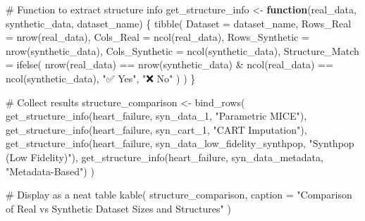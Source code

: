 \documentclass[
  letterpaper,
  DIV=11,
  numbers=noendperiod]{scrartcl}
\newenvironment{Shaded}{\begin{snugshade}}{\end{snugshade}}
\newcommand{\AttributeTok}[1]{\textcolor[rgb]{0.40,0.45,0.13}{#1}}
\newcommand{\CommentTok}[1]{\textcolor[rgb]{0.37,0.37,0.37}{#1}}
\newcommand{\ControlFlowTok}[1]{\textcolor[rgb]{0.00,0.23,0.31}{\textbf{#1}}}
\newcommand{\FunctionTok}[1]{\textcolor[rgb]{0.28,0.35,0.67}{#1}}
\newcommand{\NormalTok}[1]{\textcolor[rgb]{0.00,0.23,0.31}{#1}}
\newcommand{\OtherTok}[1]{\textcolor[rgb]{0.00,0.23,0.31}{#1}}
\newcommand{\SpecialCharTok}[1]{\textcolor[rgb]{0.37,0.37,0.37}{#1}}
\newcommand{\StringTok}[1]{\textcolor[rgb]{0.13,0.47,0.30}{#1}}
\begin{document}
\begin{Shaded}
\begin{Highlighting}[]
\CommentTok{\# Function to extract structure info}
\NormalTok{get\_structure\_info }\OtherTok{\textless{}{-}} \ControlFlowTok{function}\NormalTok{(real\_data, synthetic\_data, dataset\_name) \{}
  \FunctionTok{tibble}\NormalTok{(}
    \AttributeTok{Dataset =}\NormalTok{ dataset\_name,}
    \AttributeTok{Rows\_Real =} \FunctionTok{nrow}\NormalTok{(real\_data),}
    \AttributeTok{Cols\_Real =} \FunctionTok{ncol}\NormalTok{(real\_data),}
    \AttributeTok{Rows\_Synthetic =} \FunctionTok{nrow}\NormalTok{(synthetic\_data),}
    \AttributeTok{Cols\_Synthetic =} \FunctionTok{ncol}\NormalTok{(synthetic\_data),}
    \AttributeTok{Structure\_Match =} \FunctionTok{ifelse}\NormalTok{(}
      \FunctionTok{nrow}\NormalTok{(real\_data) }\SpecialCharTok{==} \FunctionTok{nrow}\NormalTok{(synthetic\_data) }\SpecialCharTok{\&} \FunctionTok{ncol}\NormalTok{(real\_data) }\SpecialCharTok{==} \FunctionTok{ncol}\NormalTok{(synthetic\_data),}
      \StringTok{"✅ Yes"}\NormalTok{, }\StringTok{"❌ No"}
\NormalTok{    )}
\NormalTok{  )}
\NormalTok{\}}

\CommentTok{\# Collect results}
\NormalTok{structure\_comparison }\OtherTok{\textless{}{-}} \FunctionTok{bind\_rows}\NormalTok{(}
  \FunctionTok{get\_structure\_info}\NormalTok{(heart\_failure, syn\_data\_1, }\StringTok{"Parametric MICE"}\NormalTok{),}
  \FunctionTok{get\_structure\_info}\NormalTok{(heart\_failure, syn\_cart\_1, }\StringTok{"CART Imputation"}\NormalTok{),}
  \FunctionTok{get\_structure\_info}\NormalTok{(heart\_failure, syn\_data\_low\_fidelity\_synthpop, }\StringTok{"Synthpop (Low Fidelity)"}\NormalTok{),}
  \FunctionTok{get\_structure\_info}\NormalTok{(heart\_failure, syn\_data\_metadata, }\StringTok{"Metadata{-}Based"}\NormalTok{)}
\NormalTok{)}

\CommentTok{\# Display as a neat table}
\FunctionTok{kable}\NormalTok{(}
\NormalTok{  structure\_comparison,}
  \AttributeTok{caption =} \StringTok{"Comparison of Real vs Synthetic Dataset Sizes and Structures"}
\NormalTok{)}
\end{Highlighting}
\end{Shaded}
\end{document}
